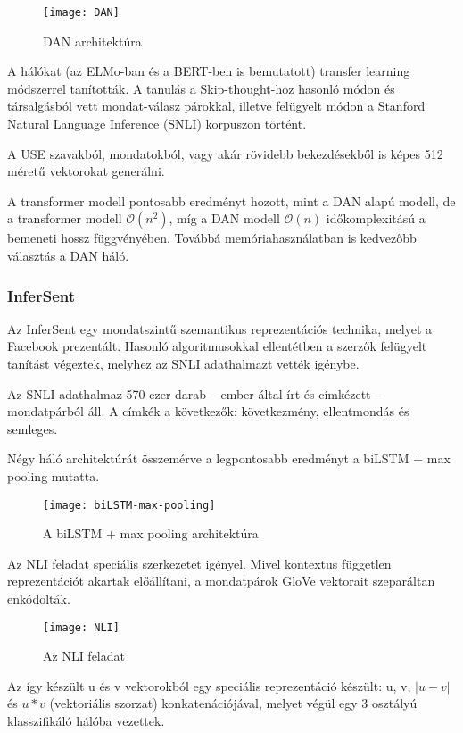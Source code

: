 \begin{figure}[H]
	\centering
	\texttt{[image: DAN]}
	\caption{DAN architektúra}
\end{figure}

A hálókat (az ELMo-ban és a BERT-ben is bemutatott) transfer learning módszerrel tanították. A tanulás a Skip-thought-hoz hasonló módon és társalgásból vett mondat-válasz párokkal, illetve felügyelt módon a Stanford Natural Language Inference (SNLI) korpuszon történt.

A USE szavakból, mondatokból, vagy akár rövidebb bekezdésekből is képes 512 méretű vektorokat generálni.

A transformer modell pontosabb eredményt hozott, mint a DAN alapú modell, de a transformer modell $\mathcal{O}(n^2)$, míg a DAN modell $\mathcal{O}(n)$ időkomplexitású a bemeneti hossz függvényében. Továbbá memóriahasználatban is kedvezőbb választás a DAN háló.

\subsubsection{InferSent}
Az InferSent egy mondatszintű szemantikus reprezentációs technika, melyet a Facebook prezentált. Hasonló algoritmusokkal ellentétben a szerzők felügyelt tanítást végeztek, melyhez az SNLI adathalmazt vették igénybe.

Az SNLI adathalmaz 570 ezer darab – ember által írt és címkézett – mondatpárból áll. A címkék a következők: következmény, ellentmondás és semleges.

Négy háló architektúrát összemérve a legpontosabb eredményt a biLSTM + max pooling mutatta. 

\begin{figure}[H]
	\centering
	\texttt{[image: biLSTM-max-pooling]}
	\caption{A biLSTM + max pooling architektúra}
\end{figure}

Az NLI feladat speciális szerkezetet igényel. Mivel kontextus független reprezentációt akartak előállítani, a mondatpárok GloVe vektorait szeparáltan enkódolták.

\begin{figure}[H]
	\centering
	\texttt{[image: NLI]}
	\caption{Az NLI feladat}
\end{figure}

Az így készült u és v vektorokból egy speciális reprezentáció készült: u, v, $\left| u - v \right|$ és $u \ast v$ (vektoriális szorzat) konkatenációjával, melyet végül egy 3 osztályú klasszifikáló hálóba vezettek.

